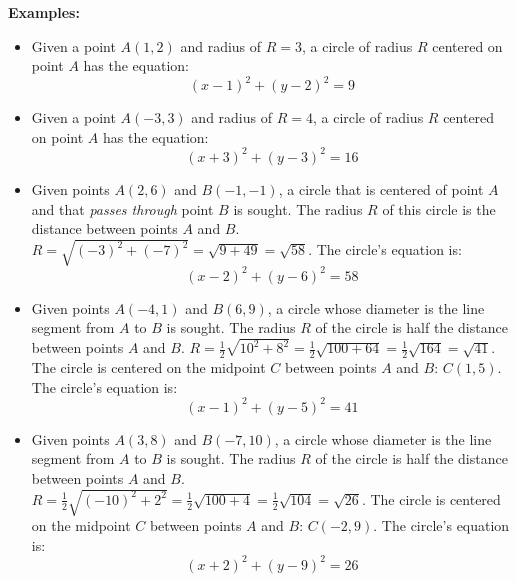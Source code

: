 \documentclass{article}
\begin{document}
\textbf{Examples:}
\begin{itemize}
\item Given a point \(A(1,2)\) and radius of \(R = 3\), a circle of radius \(R\) centered on point \(A\) has the equation:
\[(x-1)^2 + (y-2)^2 = 9\] 
\item Given a point \(A(-3,3)\) and radius of \(R = 4\), a circle of radius \(R\) centered on point \(A\) has the equation:
\[(x+3)^2 + (y-3)^2 = 16\] 
\item Given points \(A(2,6)\) and \(B(-1,-1)\), a circle that is centered of point \(A\) and that \emph{passes through} point \(B\) is sought. The radius \(R\) of this circle is the distance between points \(A\) and \(B\). \(R = \sqrt{(-3)^2 + (-7)^2} = \sqrt{9 + 49} = \sqrt{58}\). The circle's equation is: 
\[(x - 2)^2 + (y - 6)^2 = 58\]
\item Given points \(A(-4,1)\) and \(B(6,9)\), a circle whose diameter is the line segment from \(A\) to \(B\) is sought. The radius \(R\) of the circle is half the distance between points \(A\) and \(B\). \(R = \frac{1}{2}\sqrt{10^2 + 8^2} = \frac{1}{2}\sqrt{100 + 64} = \frac{1}{2}\sqrt{164} = \sqrt{41}\). The circle is centered on the midpoint \(C\) between points \(A\) and \(B\): \(C(1,5)\). The circle's equation is:
\[(x - 1)^2 + (y - 5)^2 = 41\]
\item Given points \(A(3,8)\) and \(B(-7,10)\), a circle whose diameter is the line segment from \(A\) to \(B\) is sought. The radius \(R\) of the circle is half the distance between points \(A\) and \(B\). \(R = \frac{1}{2}\sqrt{(-10)^2 + 2^2} = \frac{1}{2}\sqrt{100 + 4} = \frac{1}{2}\sqrt{104} = \sqrt{26}\). The circle is centered on the midpoint \(C\) between points \(A\) and \(B\): \(C(-2,9)\). The circle's equation is:
\[(x + 2)^2 + (y - 9)^2 = 26\]
\end{itemize}
\end{document}
